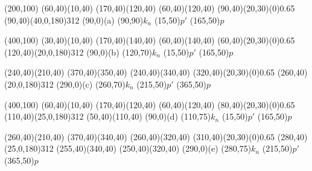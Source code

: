 	\begin{center}
	\begin{axopicture}(200,100)
		\Line[arrow](60,40)(10,40)
		\Line[arrow](170,40)(120,40)
		\Line[arrow](60,40)(120,40)
		\GOval(90,40)(20,30)(0){0.65}
		\PhotonArc(90,40)(40,0,180){3}{12}
		\Text(90,0){(a)}
		\Text(90,90){$k_n$}
		\Text(15,50){$p'$} 	\Text(165,50){$p$}
	\end{axopicture}                   
\end{center}

\begin{center}
	\begin{axopicture}(400,100)
		\Line[arrow](30,40)(10,40)
		\Line[arrow](170,40)(140,40)
		\Line(60,40)(140,40)
		\GOval(60,40)(20,30)(0){0.65}
		\PhotonArc(120,40)(20,0,180){3}{12}
		\Text(90,0){(b)}
		\Text(120,70){$k_n$}
		\Text(15,50){$p'$} 	\Text(165,50){$p$}
		
		\Line[arrow](240,40)(210,40)
		\Line[arrow](370,40)(350,40)
		\Line(240,40)(340,40)
		\GOval(320,40)(20,30)(0){0.65}
		\PhotonArc(260,40)(20,0,180){3}{12}
		\Text(290,0){(c)}
		\Text(260,70){$k_n$}
		\Text(215,50){$p'$} 	\Text(365,50){$p$}
		
	\end{axopicture}                   
\end{center}

\begin{center}
	\begin{axopicture}(400,100)
		\Line[arrow](60,40)(10,40)
		\Line[arrow](170,40)(120,40)
		\Line[arrow](60,40)(120,40)
		\GOval(80,40)(20,30)(0){0.65}
		\PhotonArc(110,40)(25,0,180){3}{12}
		\Line(50,40)(110,40)
		\Text(90,0){(d)}
		\Text(110,75){$k_n$}
		\Text(15,50){$p'$} 	\Text(165,50){$p$}
		
		\Line[arrow](260,40)(210,40)
		\Line[arrow](370,40)(340,40)
		\Line[arrow](260,40)(320,40)
		\GOval(310,40)(20,30)(0){0.65}
		\PhotonArc(280,40)(25,0,180){3}{12}
		\Line(255,40)(340,40)
		\Line(250,40)(320,40)
		\Text(290,0){(e)}
		\Text(280,75){$k_n$}
		\Text(215,50){$p'$} 	\Text(365,50){$p$}
		
	\end{axopicture}                   
\end{center}


